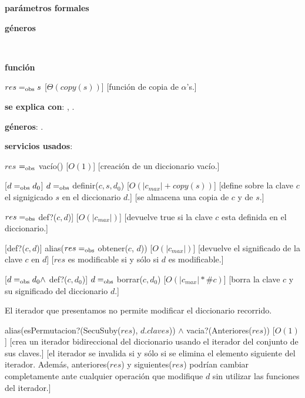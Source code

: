 \begin{Interfaz}

	\textbf{parámetros formales}\parindent\\
	\parbox{1.7cm}{\textbf{géneros}} \TipoVariable{$\alpha$}\\
	\parbox[t]{1.7cm}{\textbf{función}}\parbox[t]{\textwidth-2\parindent-1.7cm}{
		{$res =_{\mathrm{obs}} s$}
		[$\Theta(copy(s))$]
		[función de copia de $\alpha$'s.]
	}

	\textbf{se explica con}: , .

	\textbf{géneros}: \TipoVariable{\dicString, \itDicString}.

	\textbf{servicios usados}: 



	{$res$ $=_{\mathrm{obs}}$ vacío()}
	[$O(1)$]
	[creación de un diccionario vacío.]

	[$d =_{\mathrm{obs}} d_0$]
	{$d =_{\mathrm{obs}}$ definir($c, s, d_0$)}
	[$O(|c_{max}| + copy(s))$]
	[define sobre la clave $c$ el signigicado $s$ en el diccionario $d$.]
	[se almacena una copia de $c$ y de $s$.]

	{$res =_{\mathrm{obs}}$ def?($c, d$)]}
	[$O(|c_{max}|)$]
	[devuelve true si la clave $c$ esta definida en el diccionario.]

	[def?($c, d$)]
	{alias($res =_{\mathrm{obs}}$ obtener($c$, $d$))}
	[$O(|c_{max}|)$]
	[devuelve el significado de la clave $c$ en $d$]
	[$res$ es modificable si y sólo si $d$ es modificable.]

	[$d =_{\mathrm{obs}} d_0 \land$ def?($c, d_0$)]
	{$d =_{\mathrm{obs}}$ borrar($c, d_0$)}
	[$O(|c_{max}| * \#c)$]
	[borra la clave $c$ y su significado del diccionario $d$.]



	El iterador que presentamos no permite modificar el diccionario recorrido.

	{alias(esPermutacion?(SecuSuby($res$), $d.claves$)) $\land$ vacia?(Anteriores($res$))}
	[$O(1)$]
	[crea un iterador bidireccional del diccionario usando el iterador del conjunto de sus claves.]
	[el iterador se invalida si y sólo si se elimina el elemento siguiente del iterador. Además, anteriores($res$) y siguientes($res$) podrían cambiar completamente ante cualquier operación que modifique $d$ sin utilizar las funciones del iterador.]


\end{Interfaz}
